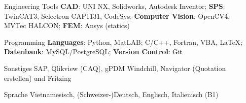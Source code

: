 

\begin{cvskills}


  \cvskill
    {Engineering Tools} %
    {\textbf{CAD}: UNI NX, Solidworks, Autodesk Inventor; 
    \newline \textbf{SPS}: TwinCAT3, Selectron CAP1131, CodeSys;
    \newline \textbf{Computer Vision}: OpenCV4, MVTec HALCON;
	\newline \textbf{FEM}: Ansys (statics)} %

%

  \cvskill
    {Programming} %
    {\textbf{Languages}: Python, MatLAB; C/C++, Fortran, VBA, LaTeX; 
    	\newline \textbf{Datenbank}: MySQL/PostgreSQL;
    	\newline \textbf{Version Control}: Git
    	} %

  \cvskill
    {Sonstiges} %
    {SAP, Qlikview (CAQ), gPDM Windchill, Navigator (Quotation erstellen) und Fritzing} %

  \cvskill
    {Sprache} %
    {Vietnamesisch, (Schweizer-)Deutsch, Englisch, Italienisch (B1)} %

\end{cvskills}
